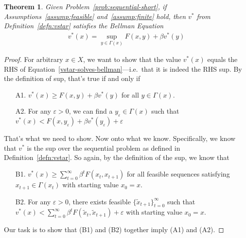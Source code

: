 \documentclass[12pt]{article}
\numberwithin{equation}{section} %
\theoremstyle{plain}
\newtheorem{thm}{Theorem}[section]
\theoremstyle{definition}
\theoremstyle{remark}
\newcommand{\sumtinfz}{\sum^\infty_{t=0}}
\begin{document}
\begin{thm}
\label{thm:vstar-solves-bellman}
Given Problem~\ref{prob:sequential-short}, if
Assumptions~\ref{assump:feasible} and~\ref{assump:finite} hold, then
$v^*$ from Definition~\ref{defn:vstar} satisfies the Bellman Equation
\begin{align}
  \label{vstar-solves-bellman}
  v^*(x) = \sup_{y\in\Gamma(x)} F(x,y) + \beta v^*(y)
\end{align}
\end{thm}
\begin{proof}
For arbitrary $x\in X$, we want to show that the value $v^*(x)$ equals
the RHS of Equation~\ref{vstar-solves-bellman}---i.e.\ that it is indeed
the RHS sup. By the definition of sup, that's true if and only if
\begin{enumerate}
  \item[A1.] $v^*(x) \geq F(x,y) + \beta v^*(y)$ for all $y\in\Gamma(x)$.
  \item[A2.] For any $\varepsilon>0$, we can find a
    $y_\varepsilon\in\Gamma(x)$ such that
    $
      v^*(x) < F(x,y_\varepsilon) + \beta v^*(y_\varepsilon) + \varepsilon
    $
\end{enumerate}
That's what we need to show. Now onto what we know.
Specifically, we know that $v^*$ is the sup over the sequential problem
as defined in Definition~\ref{defn:vstar}. So again, by the definition
of the sup, we know that
\begin{enumerate}
  \item[B1.] $v^*(x) \geq \sumtinfz \beta^t F(x_t,x_{t+1})$ for all
    feasible sequences satisfying $x_{t+1}\in\Gamma(x_t)$ with starting
    value $x_0=x$.
  \item[B2.] For any $\varepsilon>0$, there exists feasible
    $\{\tilde{x}_{t+1}\}_{t=0}^\infty$ such that
      $
      v^*(x) < \sumtinfz \beta^t
      F(\tilde{x}_{t}, \tilde{x}_{t+1}) + \varepsilon
      $
      with starting value $x_0=x$.
\end{enumerate}
Our task is to show that (B1) and (B2) together imply (A1) and (A2).


\end{proof}
\end{document}
